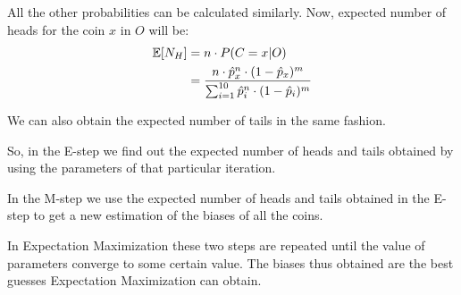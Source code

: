 \documentclass[journal, compsoc]{IEEEtran}
\begin{document}
All the other probabilities can be calculated similarly. Now, expected number of heads for the coin $x$ in $O$ will be:
\begin{equation}
\label{eqn:heads}
\begin{aligned}
\mathbb{E}[N_{H}] &= n \cdot P(C = x | O) \hspace{2mm}\\
&= \frac{n\cdot \hat{p}_{x}^{n}\cdot (1 - \hat{p}_{x})^{m}}{\sum_{i = 1}^{10} \hat{p}_{i}^{n}\cdot (1 - \hat{p}_{i})^{m}}
\end{aligned}
\end{equation}

We can also obtain the expected number of tails in the same fashion.

So, in the E-step we find out the expected number of heads and tails obtained by using the parameters of that particular iteration.

In the M-step we use the expected number of heads and tails obtained in the E-step to get a new estimation of the biases of all the coins.

In Expectation Maximization these two steps are repeated until the value of parameters converge to some certain value. The biases thus obtained
are the best guesses Expectation Maximization can obtain.

\nocite{Do2008}

\end{document}
